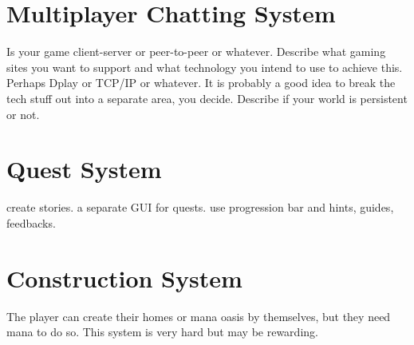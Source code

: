 \documentclass[11pt]{article}
\begin{document}
  \section{Multiplayer Chatting System}
    Is your game client-server or peer-to-peer or whatever. Describe what gaming sites you want to support and what technology you intend to use to achieve this. Perhaps Dplay or TCP/IP or whatever. It is probably a good idea to break the tech stuff out into a separate area, you decide. Describe if your world is persistent or not.

  \section{Quest System}
    create stories. a separate GUI for quests. use progression bar and hints, guides, feedbacks.

  \section{Construction System}
    The player can create their homes or mana oasis by themselves, but they need mana to do so. This system is very hard but may be rewarding.





  \newpage
  \appendix
  \appendixpage
  \addappheadtotoc
\end{document}
